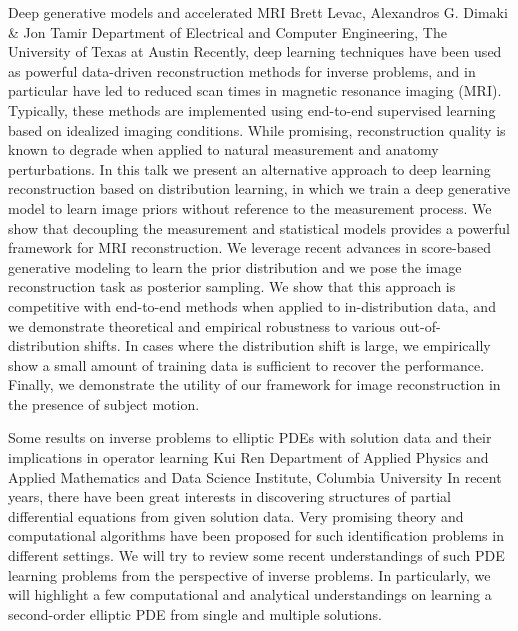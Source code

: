 \begin{addmargin}[2em]{0em}
\vspace{1.5ex}
\abs
{Deep generative models and accelerated MRI}
{Brett Levac, Alexandros G. Dimaki \& Jon Tamir}
{Department of Electrical and Computer Engineering,  The University of Texas at Austin}
{Recently, deep learning techniques have been used as powerful data-driven reconstruction methods for inverse problems, and in particular have led to reduced scan times in magnetic resonance imaging (MRI). Typically, these methods are implemented using end-to-end supervised learning based on idealized imaging conditions. While promising, reconstruction quality is known to degrade when applied to natural measurement and anatomy perturbations. In this talk we present an alternative approach to deep learning reconstruction based on distribution learning, in which we train a deep generative model to learn image priors without reference to the measurement process. We show that decoupling the measurement and statistical models provides a powerful framework for MRI reconstruction.  We leverage recent advances in score-based generative modeling to learn the prior distribution and we pose the image reconstruction task as posterior sampling.  We show that this approach is competitive with end-to-end methods when applied to in-distribution data, and we demonstrate theoretical and empirical robustness to various out-of-distribution shifts. In cases where the distribution shift is large, we empirically show a small amount of training data is sufficient to recover the performance. Finally, we demonstrate the utility of our framework for image reconstruction in the presence of subject motion.}


\vspace{1.5ex}
\abs
{Some results on inverse problems to elliptic {PDE}s with solution data and their implications in operator learning}
{Kui Ren}
{Department of Applied Physics and Applied Mathematics and Data Science Institute, Columbia University}
{In recent years, there have been great interests in discovering structures of partial differential equations from given solution data. Very promising theory and computational algorithms have been proposed for such identification problems in different settings. We will try to review some recent understandings of such PDE learning problems from the perspective of inverse problems. In particularly, we will highlight a few computational and analytical understandings on learning a second-order elliptic PDE from single and multiple solutions.}



\end{addmargin}
